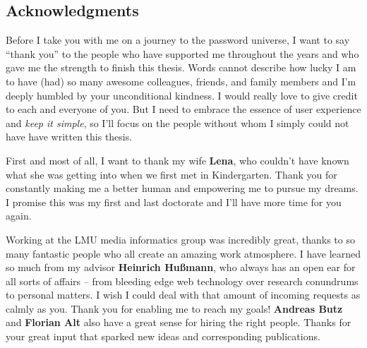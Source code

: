 \subsection*{Acknowledgments}
Before I take you with me on a journey to the password universe, I want to say ``thank you'' to the people who have supported me throughout the years and who gave me the strength to finish this thesis. Words cannot describe how lucky I am to have (had) so many awesome colleagues, friends, and family members and I’m deeply humbled by your unconditional kindness. I would really love to give credit to each and everyone of you. But I need to embrace the essence of user experience and \textit{keep it simple}, so I’ll focus on the people without whom I simply could not have have written this thesis. 

First and most of all, I want to thank my wife \textbf{Lena}, who couldn’t have known what she was getting into when we first met in Kindergarten. Thank you for constantly making me a better human and empowering me to pursue my dreams. I promise this was my first and last doctorate and I’ll have more time for you again.  

Working at the LMU media informatics group was incredibly great, thanks to so many fantastic people who all create an amazing work atmosphere. I have learned so much from my advisor \textbf{Heinrich Hußmann}, who always has an open ear for all sorts of affairs -- from bleeding edge web technology over research conundrums to personal matters. I wish I could deal with that amount of incoming requests as calmly as you. Thank you for enabling me to reach my goals! \textbf{Andreas Butz} and \textbf{Florian Alt} also have a great sense for hiring the right people. Thanks for your great input that sparked new ideas and corresponding publications. 

